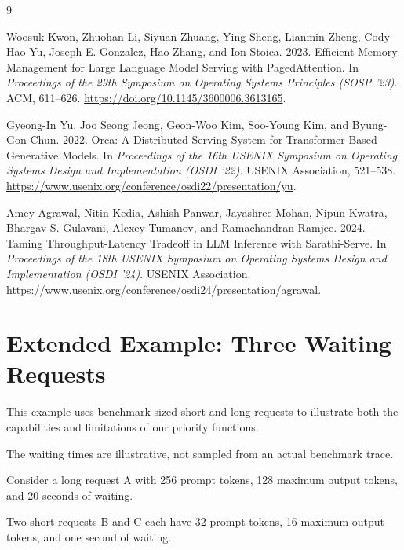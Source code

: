 \documentclass[sigplan,nonacm]{acmart}
\begin{document}
\begin{thebibliography}{9}

Woosuk Kwon, Zhuohan Li, Siyuan Zhuang,
Ying Sheng, Lianmin Zheng, Cody Hao Yu,
Joseph E. Gonzalez, Hao Zhang, and Ion Stoica.
2023.
Efficient Memory Management for Large Language
Model Serving with PagedAttention.
In \emph{Proceedings of the 29th Symposium
on Operating Systems Principles (SOSP '23)}.
ACM, 611--626.
\url{https://doi.org/10.1145/3600006.3613165}.

Gyeong-In Yu, Joo Seong Jeong, Geon-Woo Kim,
Soo-Young Kim, and Byung-Gon Chun.
2022.
Orca: A Distributed Serving System for
Transformer-Based Generative Models.
In \emph{Proceedings of the 16th USENIX
Symposium on Operating Systems Design
and Implementation (OSDI '22)}.
USENIX Association, 521--538.
\url{https://www.usenix.org/conference/osdi22/presentation/yu}.

Amey Agrawal, Nitin Kedia, Ashish Panwar,
Jayashree Mohan, Nipun Kwatra,
Bhargav S. Gulavani, Alexey Tumanov,
and Ramachandran Ramjee.
2024.
Taming Throughput-Latency Tradeoff
in LLM Inference with Sarathi-Serve.
In \emph{Proceedings of the 18th USENIX
Symposium on Operating Systems Design
and Implementation (OSDI '24)}.
USENIX Association.
\url{https://www.usenix.org/conference/osdi24/presentation/agrawal}.

\end{thebibliography}


\appendix

\section{Extended Example: Three Waiting Requests}
\label{app:example}

This example uses benchmark-sized short and long
requests to illustrate both the capabilities and
limitations of our priority functions.

The waiting times are illustrative, not sampled
from an actual benchmark trace.

Consider a long request A with 256 prompt tokens,
128 maximum output tokens, and 20 seconds of waiting.

Two short requests B and C each have 32 prompt
tokens, 16 maximum output tokens, and one second
of waiting.
\end{document}
